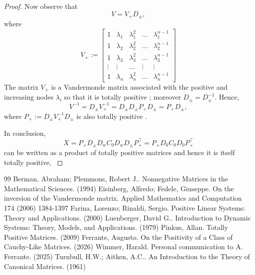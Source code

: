 \documentclass[10pt,a4paper]{amsart}
\newcommand{\tp}{^{\top}}
\def\bmat{\left[ \begin{array}}
\def\emat{\end{array} \right]}
\begin{document}
\begin{proof}
Now observe that
 $$V=V_+D_{\pm},$$
where 
$$
V_+:=\bmat{cccccc}
1&\lambda_1 & \lambda_1^2 &\dots & \lambda_1^{n-1}\\
1& \lambda_2 & \lambda_2^2 &\dots & \lambda_2^{n-1}\\
1& \lambda_3 & \lambda_3^2 &\dots & \lambda_3^{n-1}\\
\vdots&\vdots&\dots&\vdots&\vdots\\
1& \lambda_n & \lambda_n^2 &\dots & \lambda_n^{n-1}
\emat$$
The matrix  $V_+$ is a Vandermonde matrix associated with the positive and increasing nodes $\lambda_i$ so that it  is totally positive \cite[Section 4.2]{Pinkus-TPM}; moreover  $D_{\pm}=D_{\pm}^{-1}$.
Hence,
$$V^{-1}=D_{\pm}V_+^{-1}=D_{\pm}D_{\pm}P_+ D_{\pm}=P_+ D_{\pm},$$
 where $P_+:=D_{\pm}V_+^{-1} D_{\pm}$ is also totally positive
 \cite[Proposition 1.6]{Pinkus-TPM}.

In conclusion,
$$
X=P_+ D_{\pm} D_w C_0 D_w D_{\pm} P_+\tp = P_+ D_0 C_0 D_0 P_+\tp
$$ 
can be written as a product of totally positive matrices and hence it is itself  totally positive, \cite[Proposition 1.4]{Pinkus-TPM}
\end{proof}


\begin{thebibliography}{99}
 Berman, Abraham; Plemmons, Robert J.. Nonnegative Matrices in the Mathematical Sciences. (1994)
 Eisinberg, Alfredo; Fedele, Giuseppe. On the inversion of the Vandermonde matrix. Applied Mathematics and Computation 174 (2006) 1384-1397
 Farina, Lorenzo; Rinaldi, Sergio. Positive Linear Systems: Theory and Applications. (2000)
 Luenberger, David G.. Introduction to Dynamic Systems: Theory, Models, and Applications. (1979)
 Pinkus, Allan. Totally Positive Matrices. (2009)
 Ferrante, Augusto. On the Positivity of a Class of Cauchy-Like Matrices. (2026)
 Wimmer, Harald. Personal communication to {A}. {F}errante. (2025)
 Turnbull, H.W.; Aitken, A.C.. An Introduction to the Theory of Canonical Matrices. (1961)
\end{thebibliography}
\end{document}
